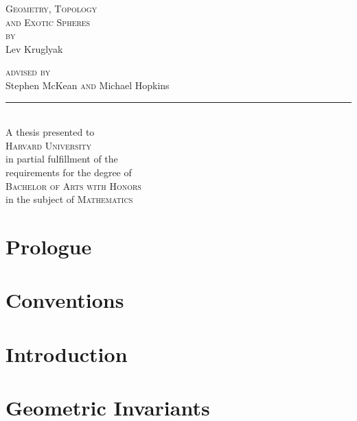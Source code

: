 \documentclass{lkx_thesis}
\begin{document}
\begin{titlepage}
	\begin{center}
		\vfill
		{\Huge\scshape Geometry, Topology\\ and Exotic Spheres}\\[4em]

		{\large\scshape by}\\[2em]
		{\Large Lev Kruglyak}\\[4in]

		{
		\large
		{\scshape advised by\\[1em]}
		{Stephen McKean}
		{\scshape  and}
		{Michael Hopkins}\\[1em]
    \noindent\rule{1in}{0.6pt}\\[1em]
		A thesis presented to \\[1em]
		\textsc{Harvard University}\\[1em]
		in partial fulfillment of the \\
		requirements for the degree of\\[1em]

		\textsc{Bachelor of Arts with Honors}\\
		in the subject of \textsc{Mathematics}
		}
		\vfill
	\end{center}
\end{titlepage}

\lkxtoc

\chapter*{Prologue}\label{chap:prologue}


\chapter*{Conventions}\label{chap:conventions}


\chapter{Introduction}\label{chap:introduction}


\chapter{Geometric Invariants}\label{chap:detection}

\end{document}
